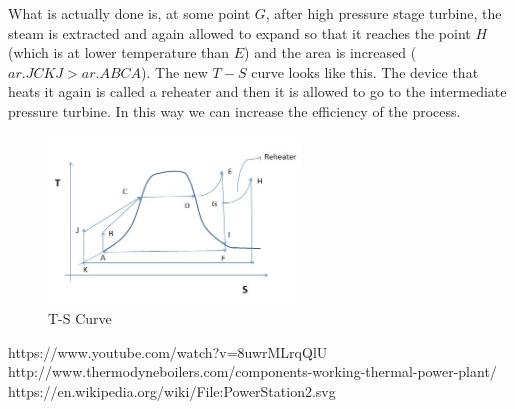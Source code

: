 \documentclass{report}
\begin{document}
\par What is actually done is, at some point $G$, after high pressure stage turbine, the steam is extracted and again allowed to expand so that it reaches the point $H$ (which is at lower temperature than $E$) and the area is increased ($ar. JCKJ > ar. ABCA$). The new $T-S$ curve looks like this. The device that heats it again is called a reheater and then it is allowed to go to the intermediate pressure turbine. In this way we can increase the efficiency of the process.
\\ 
\begin{figure}[H]
\centering \includegraphics[width=0.6\textwidth]{captures/Capture3.JPG}
\caption{T-S Curve}
\end{figure}

\begin{thebibliography}{999}
https://www.youtube.com/watch?v=8uwrMLrqQlU
http://www.thermodyneboilers.com/components-working-thermal-power-plant/
https://en.wikipedia.org/wiki/File:PowerStation2.svg
\end{thebibliography}
\end{document}
